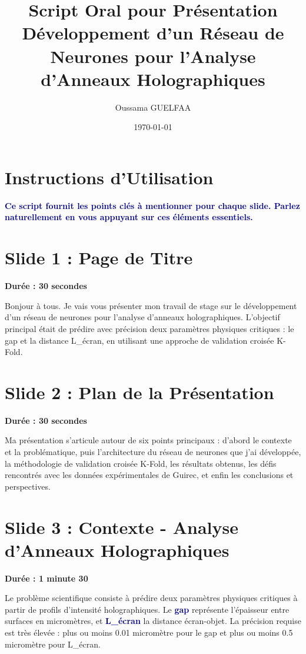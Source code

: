 \documentclass[12pt,a4paper]{article}
\title{\textbf{Script Oral pour Présentation} \\ 
       \large Développement d'un Réseau de Neurones pour l'Analyse d'Anneaux Holographiques}
\author{Oussama GUELFAA}
\date{\today}
\begin{document}
\maketitle

\section*{Instructions d'Utilisation}
\textcolor{darkblue}{\textbf{Ce script fournit les points clés à mentionner pour chaque slide. Parlez naturellement en vous appuyant sur ces éléments essentiels.}}

\vspace{0.5cm}

\section{Slide 1 : Page de Titre}
\textbf{Durée : 30 secondes}

Bonjour à tous. Je vais vous présenter mon travail de stage sur le développement d'un réseau de neurones pour l'analyse d'anneaux holographiques. L'objectif principal était de prédire avec précision deux paramètres physiques critiques : le gap et la distance L\_écran, en utilisant une approche de validation croisée K-Fold.

\section{Slide 2 : Plan de la Présentation}
\textbf{Durée : 30 secondes}

Ma présentation s'articule autour de six points principaux : d'abord le contexte et la problématique, puis l'architecture du réseau de neurones que j'ai développée, la méthodologie de validation croisée K-Fold, les résultats obtenus, les défis rencontrés avec les données expérimentales de Guirec, et enfin les conclusions et perspectives.

\section{Slide 3 : Contexte - Analyse d'Anneaux Holographiques}
\textbf{Durée : 1 minute 30}

Le problème scientifique consiste à prédire deux paramètres physiques critiques à partir de profils d'intensité holographiques. Le \textcolor{darkblue}{\textbf{gap}} représente l'épaisseur entre surfaces en micromètres, et \textcolor{darkblue}{\textbf{L\_écran}} la distance écran-objet. La précision requise est très élevée : plus ou moins 0.01 micromètre pour le gap et plus ou moins 0.5 micromètre pour L\_écran.
\end{document}

